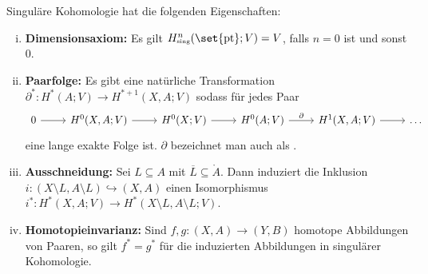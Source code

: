 \begin{satz}[{name=[Eigenschaften singulärer Kohomologie]},label=satz:110]
	Singuläre Kohomologie hat die folgenden Eigenschaften:
	\begin{enumerate}[i),itemsep=1.5pt]
		\item \textbf{Dimensionsaxiom:} Es gilt $H^n_\sing(\set{\pt};V) = V$, falls $n=0$ ist und sonst $0$. 
		\item \textbf{Paarfolge:} Es gibt eine natürliche Transformation $\partial^*\colon H^*(A;V) \to H^{*+1}(X,A;V)$ sodass für jedes Paar 
		\[
			\begin{tikzcd}
				0 \rar & H^0(X,A;V) \rar & H^0(X;V) \rar & H^0(A;V) \rar["\partial"] & H^1(X,A;V) \rar & \ldots 
			\end{tikzcd}
		\]
		eine lange exakte Folge ist. $\partial$ bezeichnet man auch als .
		\item \textbf{Ausschneidung:} Sei $L \subseteq A$ mit $\overline{L} \subseteq \mathring{A}$. Dann induziert die Inklusion 
		$i \colon (X \setminus L, A \setminus L) \hookrightarrow (X,A)$ einen Isomorphismus $i^* \colon H^*(X,A;V) \to H^*(X \setminus L, A \setminus L;V)$.
		\item \textbf{Homotopieinvarianz:} Sind $f,g \colon (X,A) \to (Y,B)$ homotope Abbildungen von Paaren, so gilt $f^* = g^*$ für die induzierten Abbildungen in singulärer 
		Kohomologie.
	\end{enumerate}
\end{satz}
